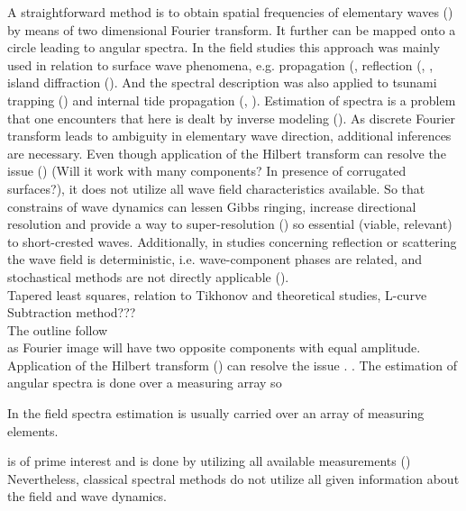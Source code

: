 A straightforward method is to obtain spatial frequencies of elementary waves (\cite{barber1963directional}) by means of two dimensional Fourier transform. It further can be mapped onto a circle leading to angular spectra. In the field studies this approach was mainly used in relation to surface wave phenomena, e.g. propagation (\cite{munk1963directional}, reflection (\cite{dickson1995wave}, \cite{thomson2005reflection}, island diffraction (\cite{pawka1983island}). And the spectral description was also applied to tsunami trapping (\cite{romano2013wavenumber}) and internal tide propagation (\cite{hendry1977observations}, \cite{lozovatsky2003spatial}). Estimation of spectra is a problem that one encounters that here is dealt by inverse modeling (\cite{long1986inverse}). As discrete Fourier transform leads to ambiguity in elementary wave direction, additional inferences are necessary. Even though application of the Hilbert transform can resolve the issue (\cite{mercier2008reflection}) (Will it work with many components? In presence of corrugated surfaces?), it does not utilize all wave field characteristics available. So that constrains of wave dynamics can lessen Gibbs ringing, increase directional resolution and provide a way to super-resolution (\cite{kay1981spectrum}) so essential (viable, relevant) to short-crested waves. Additionally, in studies concerning reflection or scattering the wave field is deterministic, i.e. wave-component phases are related, and stochastical methods are not directly applicable (\cite{benoit1997analysing}).\\

Tapered least squares, relation to Tikhonov and theoretical studies, L-curve\\

Subtraction method???\\

The outline follow\\

 as Fourier image will have two opposite components with equal amplitude. Application of the Hilbert transform (\cite{mercier2008reflection}) can resolve the issue  . 
. The estimation of angular spectra is done over a measuring array so 

In the field spectra estimation is usually carried over an array of measuring elements. 

 is of prime interest and is done by utilizing all available measurements (\cite{longuet1961observations})
Nevertheless, classical spectral methods do not utilize all given information about the field and wave dynamics. 



